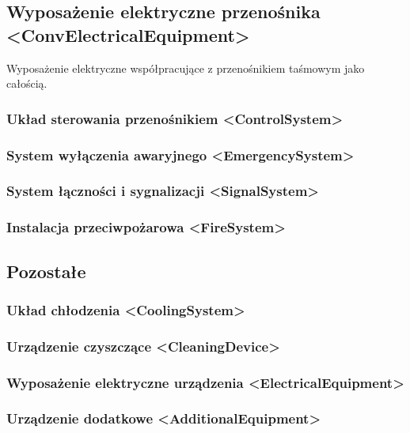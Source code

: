 \documentclass[12pt,a4paper]{article}
\begin{document}
\subsection{Wyposażenie elektryczne przenośnika <ConvElectricalEquipment>}
Wyposażenie elektryczne współpracujące z przenośnikiem taśmowym jako całością.


\subsubsection{Układ sterowania przenośnikiem <ControlSystem>}


\subsubsection{System wyłączenia awaryjnego <EmergencySystem>}


\subsubsection{System łączności i sygnalizacji <SignalSystem>}


\subsubsection{Instalacja przeciwpożarowa <FireSystem>}


\subsection{Pozostałe}

\subsubsection{Układ chłodzenia <CoolingSystem>}

\subsubsection{Urządzenie czyszczące <CleaningDevice>}

\subsubsection{Wyposażenie elektryczne urządzenia <ElectricalEquipment>}

\subsubsection{Urządzenie dodatkowe <AdditionalEquipment>}
\end{document}

